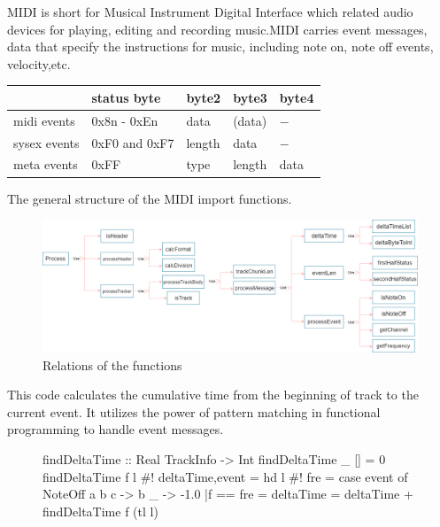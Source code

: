 \documentclass[a0,portrait]{a0poster}
\begin{document}
\begin{sectbox}

MIDI is short for Musical Instrument Digital Interface which related audio devices for playing, editing and recording music.MIDI carries event messages, data that specify the instructions for music, including note on, note off events, velocity,etc.

\vspace{1em}
\begin{table}[H]
    \centering
	\begin{tabu}{|l|m{7em}|m{4em}|m{4em}|m{4em}|}
	    \hline
	    & status byte & byte2 & byte3 & byte4 \\
        \hline
		midi events & 0x8n - 0xEn & data & (data) & $-$\\ 
		\hline
		sysex events & 0xF0 and 0xF7 & length & data & $-$\\  
		\hline
		meta events & 0xFF & type & length & data \\  
		\hline
	\end{tabu}
\end{table}

The general structure of the MIDI import functions.
\begin{figure}[H]
  \centering
    \includegraphics[width=1.0\textwidth]{functions.png}
    \caption{Relations of the functions}
\end{figure}

This code calculates the cumulative time from the beginning of track to the current event. It utilizes the power of pattern matching in functional programming to handle event messages.\\
\begin{figure}[H]
    \centering
    \begin{minipage}{0.5\textwidth}
        \begin{CleanCode}
        findDeltaTime :: Real TrackInfo -> Int
        findDeltaTime _ [] = 0
        findDeltaTime f l
            #! {deltaTime,event} = hd l  
            #! fre = case event of
            	NoteOff a b c -> b
            	_ -> -1.0
            |f == fre = deltaTime
            = deltaTime + findDeltaTime f (tl l)
        \end{CleanCode}
    \end{minipage}
\end{figure}



\end{sectbox}
\end{document}
